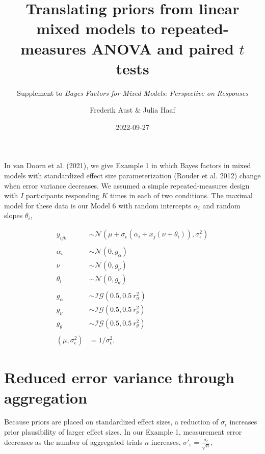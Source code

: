 \documentclass[
  a4paper,
  DIV=11,
  numbers=noendperiod,
  oneside]{scrartcl}
\title{Translating priors from linear mixed models to repeated-measures
ANOVA and paired \(t\) tests}
\subtitle{Supplement to \emph{Bayes Factors for Mixed Models:
Perspective on Responses}}
\author{Frederik Aust \& Julia Haaf}
\date{2022-09-27}
\renewcommand*\contentsname{Table of contents}
\newcommand\contentsname{Table of contents}
\begin{document}
\maketitle
\ifdefined\Shaded\renewenvironment{Shaded}{\begin{tcolorbox}[interior hidden, borderline west={3pt}{0pt}{shadecolor}, sharp corners, enhanced, frame hidden, boxrule=0pt, breakable]}{\end{tcolorbox}}\fi

\renewcommand*\contentsname{Table of contents}
{
\hypersetup{linkcolor=}
\setcounter{tocdepth}{3}
\tableofcontents
}
In van Doorn et al. (2021), we give Example 1 in which Bayes factors in
mixed models with standardized effect size parameterization (Rouder et
al. 2012) change when error variance decreases. We assumed a simple
repeated-measures design with \(I\) participants responding \(K\) times
in each of two conditions. The maximal model for these data is our Model
6 with random intercepts \(\alpha_i\) and random slopes \(\theta_i\),

\[
\begin{aligned}
y_{ijk} & \sim \mathcal{N}(\mu + \sigma_\epsilon (\alpha_i + x_j (\nu + \theta_i)), \sigma^2_\epsilon) \\ & \\
\alpha_i & \sim \mathcal{N}(0, g_\alpha) \\
\nu & \sim \mathcal{N}(0, g_{\nu}) \\
\theta_i & \sim \mathcal{N}(0, g_\theta) \\ & \\
g_{\alpha} & \sim \mathcal{IG}(0.5, 0.5~r_{\alpha}^2) \\
g_{\nu} & \sim \mathcal{IG}(0.5, 0.5~r_{\nu}^2) \\
g_{\theta} & \sim \mathcal{IG}(0.5, 0.5~r_{\theta}^2) \\ & \\
(\mu, \sigma^2_\epsilon) & = 1/\sigma^2_\epsilon.
\end{aligned}
\]

\hypertarget{reduced-error-variance-through-aggregation}{%
\section{Reduced error variance through
aggregation}\label{reduced-error-variance-through-aggregation}}

Because priors are placed on standardized effect sizes, a reduction of
\(\sigma_\epsilon\) increases prior plausibility of larger effect sizes.
In our Example 1, measurement error decreases as the number of
aggregated trials \(n\) increases,
\(\sigma\prime_\epsilon = \frac{\sigma_\epsilon}{\sqrt{n}}\),
\end{document}
